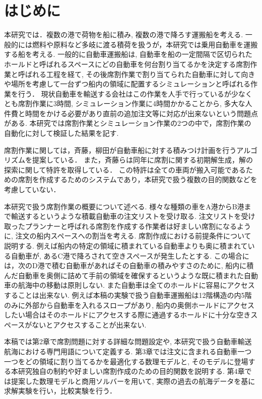 \chapter{はじめに}
本研究では．複数の港で荷物を船に積み, 複数の港で降ろす運搬船を考える. 一般的には燃料や原料など多岐に渡る積荷を扱うが，本研究では乗用自動車を運搬する船を考える. 一般的に自動車運搬船は, 自動車を船の一定間隔で区切られたホールドと呼ばれるスペースにどの自動車を何台割り当てるかを決定する席割作業と呼ばれる工程を経て, その後席割作業で割り当てられた自動車に対して向きや場所を考慮して一台ずつ船内の領域に配置するシミュレーションと呼ばれる作業を行う． 現状自動車を輸送する会社はこの作業を人手で行っているが少なくとも席割作業に3時間, シミュレーション作業に4時間かかることから, 多大な人件費と時間をかける必要があり直前の追加注文等に対応が出来ないという問題点がある\cite{mitsui}. 本研究では席割作業とシミュレーション作業の2つの中で，席割作業の自動化に対して検証した結果を記す.

席割作業に関しては，斉藤，柳田が自動車船に対する積みつけ計画を行うアルゴリズムを提案している．\cite{saito} また，斉藤らは同年に席割に関する初期解生成，解の探索に関して特許を取得している．\cite{tokkyo}
この特許は全ての車両が搬入可能であるための席割を作成するためのシステムであり，本研究で扱う複数の目的関数などを考慮していない．

本研究で扱う席割作業の概要について述べる. 様々な種類の車をA港からB港まで輸送するというような積載自動車の注文リストを受け取る. 注文リストを受け取ったプランナーと呼ばれる席割を作成する作業者は好ましい席割になるように, 注文の船内スペースへの割当を考える. 席割作成における前提条件について説明する. 例えば船内の特定の領域に積まれている自動車よりも奥に積まれている自動車が, あるC港で降ろされて空きスペースが発生したとする. この場合には，次のD港で積む自動車があればその自動車の積みやすさのために, 船内に積んだ自動車を奥側に詰めて手前の領域を確保するというような既に積まれた自動車の航海中の移動は原則しない. また自動車は全てのホールドに容易にアクセスすることは出来ない. 例えば本稿の実験で扱う自動車運搬船は12階構造の内5階のみに外部から自動車を入れるスロープがあり, 船内の奥側ホールドにアクセスしたい場合はそのホールドにアクセスする際に通過するホールドに十分な空きスペースがないとアクセスすることが出来ない.

本稿では第2章で席割問題に対する詳細な問題設定や, 本研究で扱う自動車輸送航海における専門用語について定義する.  第3章では注文に含まれる自動車一つ一つをどの領域に割り当てるかを最適化する数理モデルと, そのモデルに登場する本研究独自の制約や好ましい席割作成のための目的関数を説明する. 第4章では提案した数理モデルと商用ソルバーを用いて, 実際の過去の航海データを基に求解実験を行い，比較実験を行う．
